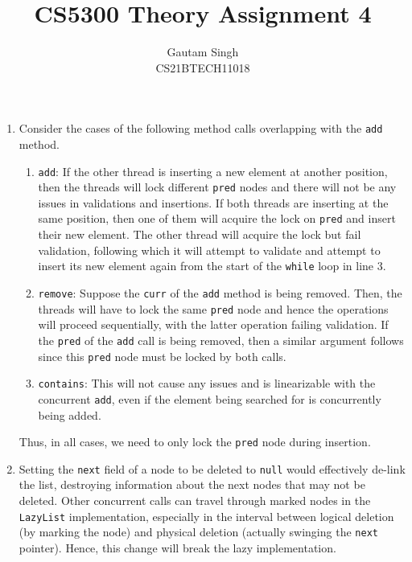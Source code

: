 \documentclass[conference,compsoc,twocolumn]{IEEEtran}
\begin{document}
\vspace{3cm}
\title{CS5300 Theory Assignment 4}
\author{Gautam Singh\\CS21BTECH11018}
\maketitle

\bigskip

\begin{enumerate}
    \item Consider the cases of the following method calls overlapping with the
    \texttt{add} method.
    \begin{enumerate}
        \item \texttt{add}: If the other thread is inserting a new element at
        another position, then the threads will lock different \texttt{pred}
        nodes and there will not be any issues in validations and insertions. If
        both threads are inserting at the same position, then one of them will
        acquire the lock on \texttt{pred} and insert their new element. The
        other thread will acquire the lock but fail validation, following which
        it will attempt to validate and attempt to insert its new element again
        from the start of the \texttt{while} loop in line 3.

        \item \texttt{remove}: Suppose the \texttt{curr} of the \texttt{add}
        method is being removed. Then, the threads will have to lock the same
        \texttt{pred} node and hence the operations will proceed sequentially,
        with the latter operation failing validation. If the \texttt{pred} of
        the \texttt{add} call is being removed, then a similar argument follows
        since this \texttt{pred} node must be locked by both calls.

        \item \texttt{contains}: This will not cause any issues and is
        linearizable with the concurrent \texttt{add}, even if the element being
        searched for is concurrently being added.
    \end{enumerate}

    Thus, in all cases, we need to only lock the \texttt{pred} node during
    insertion.

    \item Setting the \texttt{next} field of a node to be deleted to
    \texttt{null} would effectively de-link the list, destroying information
    about the next nodes that may not be deleted. Other concurrent calls can
    travel through marked nodes in the \texttt{LazyList} implementation,
    especially in the interval between logical deletion (by marking the node)
    and physical deletion (actually swinging the \texttt{next} pointer). Hence,
    this change will break the lazy implementation.


\end{enumerate}
\end{document}
